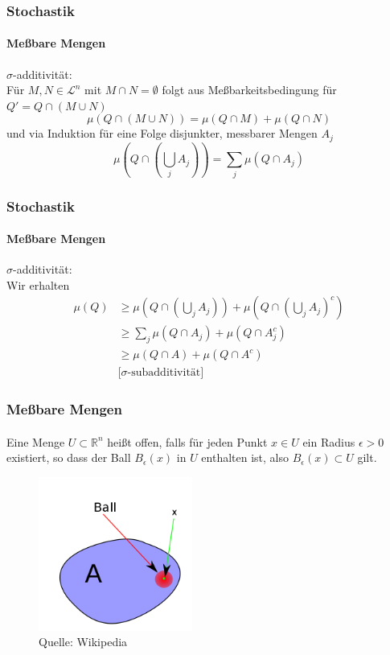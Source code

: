 \documentclass{beamer}
\begin{document}
\begin{frame}
    \frametitle{Stochastik}
\framesubtitle{Meßbare Mengen}
$\sigma$-additivität: \\
Für $M,N \in \mathcal{L}^n$ mit $M \cap N = \emptyset$ folgt aus Meßbarkeitsbedingung für $Q' = Q \cap (M \cup N)$
$$ \mu (Q \cap (M \cup N)) = \mu (Q \cap M) +  \mu (Q \cap N)$$
und via Induktion für eine Folge disjunkter, messbarer Mengen $A_j$
$$ \mu (Q \cap (\bigcup_j A_j)) = \sum_j \mu (Q \cap A_j)$$

\end{frame}



\begin{frame}
    \frametitle{Stochastik}
\framesubtitle{Meßbare Mengen}
$\sigma$-additivität: \\
Wir erhalten 
\begin{align*}
    \mu(Q) & \geq \mu(Q \cap (\bigcup_j A_j)) + \mu(Q \cap (\bigcup_j A_j)^c) \\
    & \geq \sum_j \mu(Q \cap A_j) + \mu(Q \cap A_j^c) \\
    & \geq \mu(Q \cap A) + \mu(Q \cap A^c) \\
    & \text{[$\sigma$-subadditivität]}
\end{align*}
\end{frame}



\begin{frame}
    \frametitle{Meßbare Mengen}
\framesubtitle{}

\begin{block}{}
Eine Menge $U \subset  \mathbb{R}^n$ heißt offen, falls für jeden Punkt $x \in U$ ein Radius $\epsilon > 0$ existiert, so dass der Ball $B_\epsilon (x)$ in $U$ enthalten ist, also 
$B_\epsilon (x) \subset U$ gilt.
\end{block}

\begin{figure}[htp]
      \centering
    \includegraphics[width=0.45\textwidth]{img/openset}
      \caption{Quelle: Wikipedia}
\end{figure}


 \end{frame}
\end{document}
